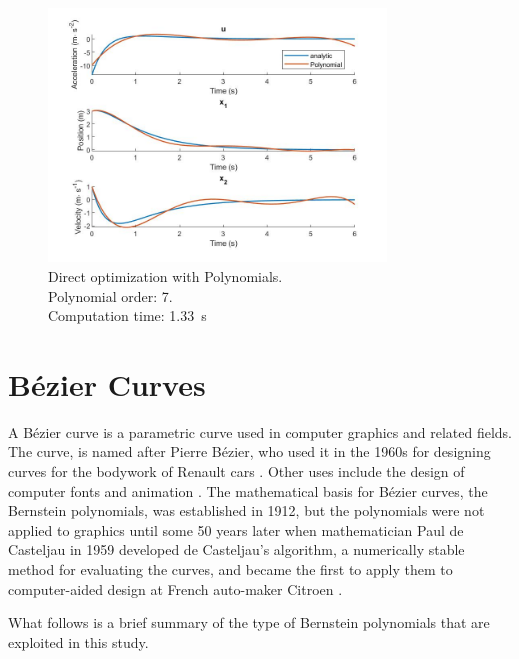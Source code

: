 \begin{figure}[h!]
\centering
\includegraphics[width=0.8\textwidth]{Images/solution_pol.jpg}
\caption{Direct optimization with Polynomials. \\ Polynomial order: 7. \\
Computation time: \SI{1.33}{\second}}
\label{fig:solution_pol}
\end{figure}



\section{Bézier Curves}
\label{sec:bezcurves}
\par A Bézier curve is a parametric curve used in computer graphics and related fields. The curve, is named after Pierre Bézier, who used it in the 1960s for designing curves for the bodywork of Renault cars \cite{hazewinkelmichiel1997}.  Other uses include the design of computer fonts and animation \cite{hazewinkelmichiel1997}. 
The mathematical basis for Bézier curves, the Bernstein polynomials, was established in 1912, but the polynomials were not applied to graphics until some 50 years later when mathematician Paul de Casteljau in 1959 developed de Casteljau's algorithm, a numerically stable method for evaluating the curves, and became the first to apply them to computer-aided design at French auto-maker Citroen \cite{GeraldFarin2002}. 

\par What follows is a brief summary of the type of Bernstein polynomials that are exploited in this study.

